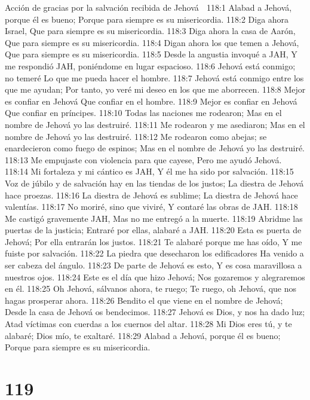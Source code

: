 Acción de gracias por la salvación recibida de Jehová 

118:1 Alabad a Jehová, porque él es bueno; 
Porque para siempre es su misericordia. 
118:2 Diga ahora Israel, 
Que para siempre es su misericordia. 
118:3 Diga ahora la casa de Aarón, 
Que para siempre es su misericordia. 
118:4 Digan ahora los que temen a Jehová, 
Que para siempre es su misericordia. 
118:5 Desde la angustia invoqué a JAH, 
Y me respondió JAH, poniéndome en lugar espacioso. 
118:6 Jehová está conmigo; no temeré 
Lo que me pueda hacer el hombre. 
118:7 Jehová está conmigo entre los que me ayudan; 
Por tanto, yo veré mi deseo en los que me aborrecen. 
118:8 Mejor es confiar en Jehová 
Que confiar en el hombre. 
118:9 Mejor es confiar en Jehová 
Que confiar en príncipes. 
118:10 Todas las naciones me rodearon; 
Mas en el nombre de Jehová yo las destruiré. 
118:11 Me rodearon y me asediaron; 
Mas en el nombre de Jehová yo las destruiré. 
118:12 Me rodearon como abejas; se enardecieron como fuego de espinos; 
Mas en el nombre de Jehová yo las destruiré. 
118:13 Me empujaste con violencia para que cayese, 
Pero me ayudó Jehová. 
118:14 Mi fortaleza y mi cántico es JAH, 
Y él me ha sido por salvación. 
118:15 Voz de júbilo y de salvación hay en las tiendas de los justos; 
La diestra de Jehová hace proezas. 
118:16 La diestra de Jehová es sublime; 
La diestra de Jehová hace valentías. 
118:17 No moriré, sino que viviré, 
Y contaré las obras de JAH. 
118:18 Me castigó gravemente JAH, 
Mas no me entregó a la muerte. 
118:19 Abridme las puertas de la justicia; 
Entraré por ellas, alabaré a JAH. 
118:20 Esta es puerta de Jehová; 
Por ella entrarán los justos. 
118:21 Te alabaré porque me has oído, 
Y me fuiste por salvación. 
118:22 La piedra que desecharon los edificadores 
Ha venido a ser cabeza del ángulo. 
118:23 De parte de Jehová es esto, 
Y es cosa maravillosa a nuestros ojos. 
118:24 Este es el día que hizo Jehová; 
Nos gozaremos y alegraremos en él. 
118:25 Oh Jehová, sálvanos  ahora, te ruego; 
Te ruego, oh Jehová, que nos hagas prosperar ahora. 
118:26 Bendito el que viene en el nombre de Jehová; 
Desde la casa de Jehová os bendecimos. 
118:27 Jehová es Dios, y nos ha dado luz; 
Atad víctimas con cuerdas a los cuernos del altar. 
118:28 Mi Dios eres tú, y te alabaré; 
Dios mío, te exaltaré. 
118:29 Alabad a Jehová, porque él es bueno; 
Porque para siempre es su misericordia. 

\chapter{119}

